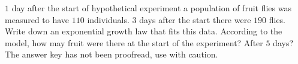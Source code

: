 \label{problemFruitFliesExponentialGrowth1day110;3days190;HowMany0daysHowMany5days}
$1$ day after the start of hypothetical experiment a population of fruit flies was measured to have $110$ individuals. $3$ days after the start there were $190$ flies. Write down an exponential growth law that fits this data. According to the model, how may fruit were there at the start of the experiment? After $5$ days? The answer key has not been proofread, use with caution.

